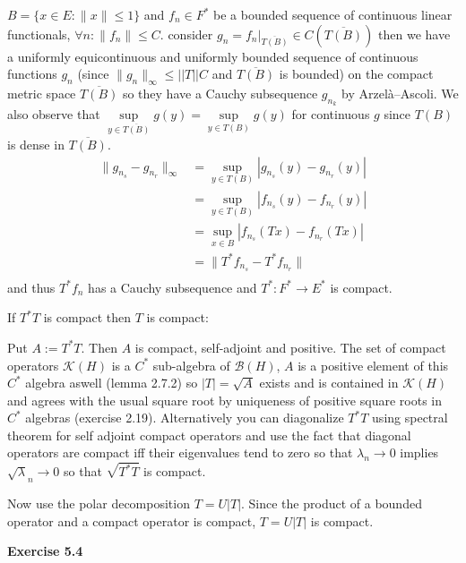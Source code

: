\documentclass{article}
\begin{document}
\noindent $B = \{x \in E : \|x\| \leq 1 \}$ and $f_n \in F^*$ be a bounded sequence of continuous linear functionals, $\forall n:\|f_n\| \leq C$.
consider $g_n = f_n|_{\overline {T(B)}} \in C(\overline {T(B)})$ then we have a uniformly equicontinuous and uniformly bounded sequence of continuous functions $g_n$ (since $\|g_n\|_{\infty} \leq ||T||C$ and $\overline{T(B)}$ is bounded) on the compact metric space $\overline{T(B)}$ so they have a Cauchy subsequence $g_{n_k}$ by Arzelà–Ascoli. We also observe that $\sup\limits_{y \in \overline{T(B)}}g(y) = \sup\limits_{y \in T(B)} g(y)$ for continuous $g$ since $T(B)$ is dense in $\overline{T(B)}$.
\begin{align*}
\| g_{n_s} -  g_{n_r} \|_{\infty} &= \sup_{y \in T(B)} |g_{n_s}(y) -  g_{n_r}(y)| \\
& = \sup_{y \in T(B)} |f_{n_s}(y) -  f_{n_r}(y)| \\
& = \sup_{x \in B} |f_{n_s}(Tx) -  f_{n_r}(Tx)|\\
& = \|T^*f_{n_s} -  T^*f_{n_r}\|\\
\end{align*}
and thus $T^*f_n$ has a Cauchy subsequence and $T^* : F^* \rightarrow E^*$ is compact.

\vspace{0.3cm}

\noindent If $T^*T$ is compact then $T$ is compact:

\vspace{0.3cm}

Put $A:=T^*T$. Then $A$ is compact, self-adjoint and positive. The set of compact operators $\mathcal K(H)$ is a $C^*$ sub-algebra of $\mathcal B(H)$, $A$ is a positive element of this $C^*$ algebra aswell (lemma 2.7.2) so $|T| =\sqrt A$ exists and is contained in $\mathcal K(H)$ and agrees with the usual square root by uniqueness of positive square roots in $C^*$ algebras (exercise 2.19). Alternatively you can diagonalize $T^*T$ using spectral theorem for self adjoint compact operators and use the fact that diagonal operators are compact iff their eigenvalues tend to zero so that $ \lambda_n \rightarrow 0$ implies $\sqrt \lambda_n \rightarrow 0$ so that $\sqrt{T^*T}$ is compact.

Now use the polar decomposition $T=U|T|$. Since the product of a bounded operator and a compact operator is compact, $T=U|T|$ is compact.
 
\vspace{0.5cm}

\textbf{Exercise 5.4}
\end{document}
